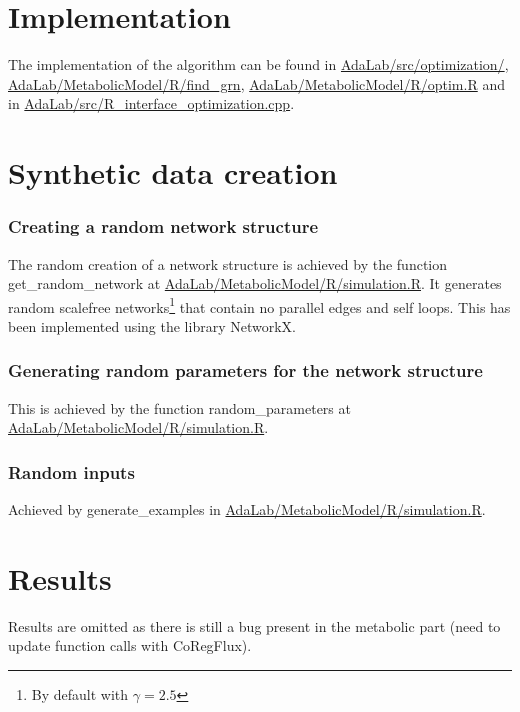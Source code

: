 \section{Implementation}
The implementation of the algorithm can be found in \url{AdaLab/src/optimization/}, 
\url{AdaLab/MetabolicModel/R/find_grn}, \url{AdaLab/MetabolicModel/R/optim.R} and in 
\url{AdaLab/src/R_interface_optimization.cpp}.

\section{Synthetic data creation}
\subsubsection{Creating a random network structure}
The random creation of a network structure is achieved by the function get\_random\_network 
at \url{AdaLab/MetabolicModel/R/simulation.R}. It generates random scalefree networks\footnote{By default
with $\gamma = 2.5$} that contain no parallel edges and self loops. This has been implemented using the library NetworkX\cite{hagberg-2008-exploring}.
\subsubsection{Generating random parameters for the network structure}
This is achieved by the function random\_parameters at \url{AdaLab/MetabolicModel/R/simulation.R}. 
\subsubsection{Random inputs}
Achieved by generate\_examples in \url{AdaLab/MetabolicModel/R/simulation.R}. 
\section{Results}
Results are omitted as there is still a bug present in the metabolic part (need to update function calls with CoRegFlux).